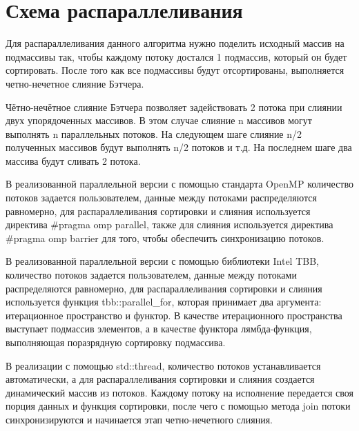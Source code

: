 \documentclass{report}
\begin{document}
\section*{Схема распараллеливания}
Для распараллеливания данного алгоритма нужно поделить исходный массив на подмассивы так, чтобы каждому потоку достался 1 подмассив, который он будет сортировать. После того как все подмассивы будут отсортированы, выполняется четно-нечетное слияние Бэтчера. 
\par Чётно-нечётное слияние Бэтчера позволяет задействовать 2 потока при
слиянии двух упорядоченных массивов. В этом случае слияние n массивов
могут выполнять n параллельных потоков. На следующем шаге слияние n/2
полученных массивов будут выполнять n/2 потоков и т.д. На последнем
шаге два массива будут сливать 2 потока. 
\par В реализованной параллельной версии с помощью стандарта OpenMP количество потоков задается пользователем, данные между потоками распределяются равномерно, для распараллеливания сортировки и слияния используется директива \#pragma omp parallel, также для слияния используется директива \#pragma omp barrier для того, чтобы обеспечить синхронизацию потоков.
\par В реализованной параллельной версии с помощью библиотеки Intel TBB, количество потоков задается пользователем, данные между потоками распределяются равномерно, для распараллеливания сортировки и слияния используется функция tbb::parallel\_for, которая принимает два аргумента: итерационное пространство и функтор. В качестве итерационного пространства выступает подмассив элементов, а в качестве функтора лямбда-функция, выполняющая поразрядную сортировку подмассива.
\par В реализации с помощью std::thread, количество потоков устанавливается автоматически, а для распараллеливания сортировки и слияния создается динамический массив из потоков. Каждому потоку на исполнение передается своя порция данных и функция сортировки, после чего с помощью метода join потоки синхронизируются и начинается этап четно-нечетного слияния.
\newpage

\end{document}
